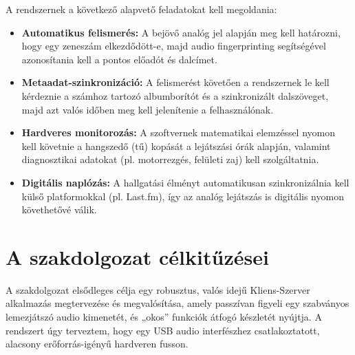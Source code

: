 A rendszernek a következő alapvető feladatokat kell megoldania:
\begin{itemize}
    \item \textbf{Automatikus felismerés:} A bejövő analóg jel alapján meg kell határozni, hogy egy zeneszám elkezdődött-e, majd audio fingerprinting segítségével azonosítania kell a pontos előadót és dalcímet.
    \item \textbf{Metaadat-szinkronizáció:} A felismerést követően a rendszernek le kell kérdeznie a számhoz tartozó albumborítót és a szinkronizált dalszöveget, majd azt valós időben meg kell jelenítenie a felhasználónak.
    \item \textbf{Hardveres monitorozás:} A szoftvernek matematikai elemzéssel nyomon kell követnie a hangszedő (tű) kopását a lejátszási órák alapján, valamint diagnosztikai adatokat (pl. motorrezgés, felületi zaj) kell szolgáltatnia.
    \item \textbf{Digitális naplózás:} A hallgatási élményt automatikusan szinkronizálnia kell külső platformokkal (pl. Last.fm), így az analóg lejátszás is digitális nyomon követhetővé válik.
\end{itemize}

\section{A szakdolgozat célkitűzései}
A szakdolgozat elsődleges célja egy robusztus, valós idejű Kliens-Szerver alkalmazás megtervezése és megvalósítása, amely passzívan figyeli egy szabványos lemezjátszó audio kimenetét, és „okos” funkciók átfogó készletét nyújtja. A rendszert úgy terveztem, hogy egy USB audio interfészhez csatlakoztatott, alacsony erőforrás-igényű hardveren fusson.

